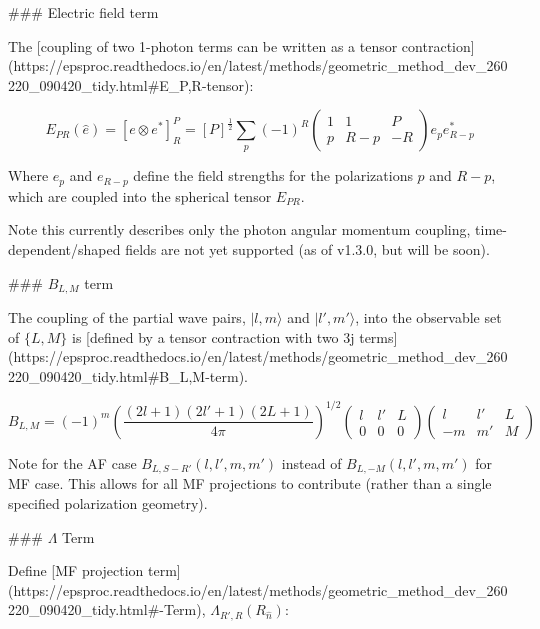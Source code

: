### Electric field term

The [coupling of two 1-photon terms can be written as a tensor contraction](https://epsproc.readthedocs.io/en/latest/methods/geometric_method_dev_260220_090420_tidy.html#E_{P,R}-tensor):

\begin{equation}
E_{PR}(\hat{e})=[e\otimes e^{*}]_{R}^{P}=[P]^{\frac{1}{2}}\sum_{p}(-1)^{R}\left(\begin{array}{ccc}
1 & 1 & P\\
p & R-p & -R
\end{array}\right)e_{p}e_{R-p}^{*}\label{eq:EPR-defn-1}
\end{equation}

Where $e_{p}$ and $e_{R-p}$ define the field strengths for the polarizations $p$ and $R-p$, which are coupled into the spherical tensor $E_{PR}$.

Note this currently describes only the photon angular momentum coupling, time-dependent/shaped fields are not yet supported (as of v1.3.0, but will be soon).


### $B_{L,M}$ term

The coupling of the partial wave pairs, $|l,m\rangle$ and $|l',m'\rangle$, into the observable set of $\{L,M\}$ is [defined by a tensor contraction with two 3j terms](https://epsproc.readthedocs.io/en/latest/methods/geometric_method_dev_260220_090420_tidy.html#B_{L,M}-term).

\begin{equation}
B_{L,M}=(-1)^{m}\left(\frac{(2l+1)(2l'+1)(2L+1)}{4\pi}\right)^{1/2}\left(\begin{array}{ccc}
l & l' & L\\
0 & 0 & 0
\end{array}\right)\left(\begin{array}{ccc}
l & l' & L\\
-m & m' & M
\end{array}\right)
\end{equation}

Note for the AF case $B_{L,S-R'}(l,l',m,m')$ instead of $B_{L,-M}(l,l',m,m')$ for MF case. This allows for all MF projections to contribute (rather than a single specified polarization geometry).


### $\Lambda$ Term

Define [MF projection term](https://epsproc.readthedocs.io/en/latest/methods/geometric_method_dev_260220_090420_tidy.html#\Lambda-Term), $\Lambda_{R',R}(R_{\hat{n}})$:

